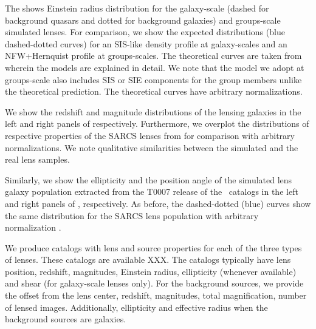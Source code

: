 \documentclass[useAMS,usenatbib,a4paper]{mn2e}
\begin{document}
The  shows Einstein radius distribution for the
galaxy-scale (dashed for background quasars and dotted for background galaxies)
and groups-scale simulated lenses. For comparison, we show the expected
distributions (blue dashed-dotted curves) for an SIS-like density profile at
galaxy-scales and an NFW+Hernquist profile at groups-scales. The 
theoretical curves are taken from \citep{More2012} wherein the models are
explained in detail. We note that the model we adopt at groups-scale also
includes SIS or SIE components for the group members unlike the theoretical
prediction. The theoretical curves have arbitrary normalizations.

We show the redshift and magnitude distributions of the lensing galaxies in the
left and right panels of 
respectively. Furthermore, we overplot the distributions of respective
properties of the SARCS lenses from \citep{More2012} for comparison with arbitrary
normalizations. We note qualitative similarities between the simulated and the
real lens samples.

Similarly, we show the ellipticity and the position angle of the simulated lens
galaxy population extracted from the T0007 release of the \cfhtls~catalogs in the
left and right panels of , respectively. As before, the
dashed-dotted (blue) curves show the same distribution for the SARCS lens
population with arbitrary normalization \citep{More2012}.


We produce catalogs with lens and source properties for each of the three types
of lenses. These catalogs are available XXX. The catalogs typically have lens
position, redshift, magnitudes, Einstein radius, ellipticity (whenever
available) and shear (for galaxy-scale lenses only). For the background
sources, we provide the offset from the lens center, redshift, magnitudes,
total magnification, number of lensed images. Additionally, ellipticity and
effective radius when the background sources are galaxies.
\end{document}
